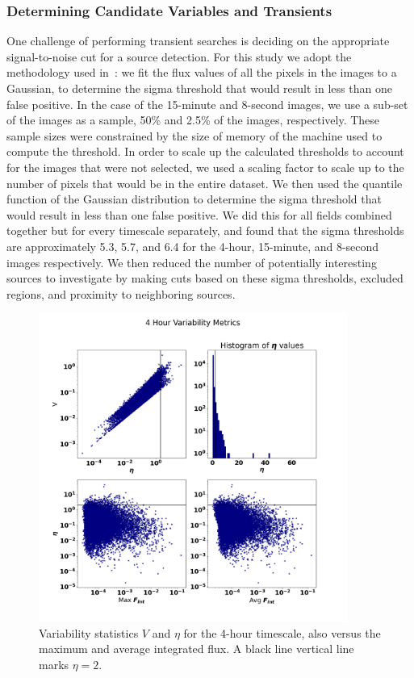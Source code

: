 \documentclass[12pt]{article}
\begin{document}
\subsubsection{Determining Candidate Variables and Transients}
\label{sec:determinecand}
One challenge of performing transient searches is deciding on the appropriate signal-to-noise cut for a source detection. For this study we adopt the methodology used in~\citep{2022MNRAS.517.2894R}: we fit the flux values of all the pixels in the images to a Gaussian, to determine the sigma threshold that would result in less than one false positive. In the case of the 15-minute and 8-second images, we use a sub-set of the images as a sample, 50\% and 2.5\% of the images, respectively. These sample sizes were constrained by the size of memory of the machine used to compute the threshold. In order to scale up the calculated thresholds to account for the images that were not selected, we used a scaling factor to scale up to the number of pixels that would be in the entire dataset. We then used the quantile function of the Gaussian distribution to determine the sigma threshold that would result in less than one false positive. We did this for all fields combined together but for every timescale separately, and found that the sigma thresholds are approximately 5.3, 5.7, and 6.4 for the 4-hour, 15-minute, and 8-second images respectively. We then reduced the number of potentially interesting sources to investigate by making cuts based on these sigma thresholds, excluded regions, and proximity to neighboring sources.
\begin{figure}
	\includegraphics[width=0.9\textwidth]{4_Hour_Variability_Metrics.png}
	\caption{Variability statistics $V$ and $\eta$ for the 4-hour timescale, also versus the maximum and average integrated flux. A black line vertical line marks $\eta=2$.}
	\label{fig:varstat4hr}
\end{figure}
\end{document}
